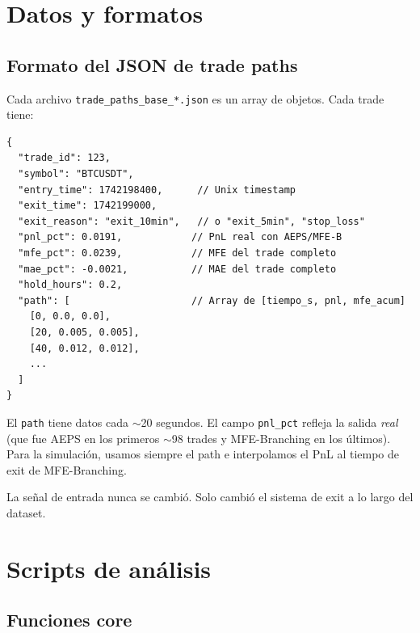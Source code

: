 \documentclass[11pt,a4paper]{article}
\begin{document}
\section{Datos y formatos}
 
\subsection{Formato del JSON de trade paths}
 
Cada archivo \texttt{trade\_paths\_base\_*.json} es un array de objetos. Cada trade tiene:
 
\begin{lstlisting}[language={}]
{
  "trade_id": 123,
  "symbol": "BTCUSDT",
  "entry_time": 1742198400,      // Unix timestamp
  "exit_time": 1742199000,
  "exit_reason": "exit_10min",   // o "exit_5min", "stop_loss"
  "pnl_pct": 0.0191,            // PnL real con AEPS/MFE-B
  "mfe_pct": 0.0239,            // MFE del trade completo
  "mae_pct": -0.0021,           // MAE del trade completo
  "hold_hours": 0.2,
  "path": [                     // Array de [tiempo_s, pnl, mfe_acum]
    [0, 0.0, 0.0],
    [20, 0.005, 0.005],
    [40, 0.012, 0.012],
    ...
  ]
}
\end{lstlisting}
 
El \texttt{path} tiene datos cada $\sim$20 segundos. El campo \texttt{pnl\_pct} refleja la salida \emph{real} (que fue AEPS en los primeros $\sim$98 trades y MFE-Branching en los últimos). Para la simulación, usamos siempre el path e interpolamos el PnL al tiempo de exit de MFE-Branching.
 
La señal de entrada nunca se cambió. Solo cambió el sistema de exit a lo largo del dataset.
 
\section{Scripts de análisis}
 
\subsection{Funciones core}
 
\end{document}
